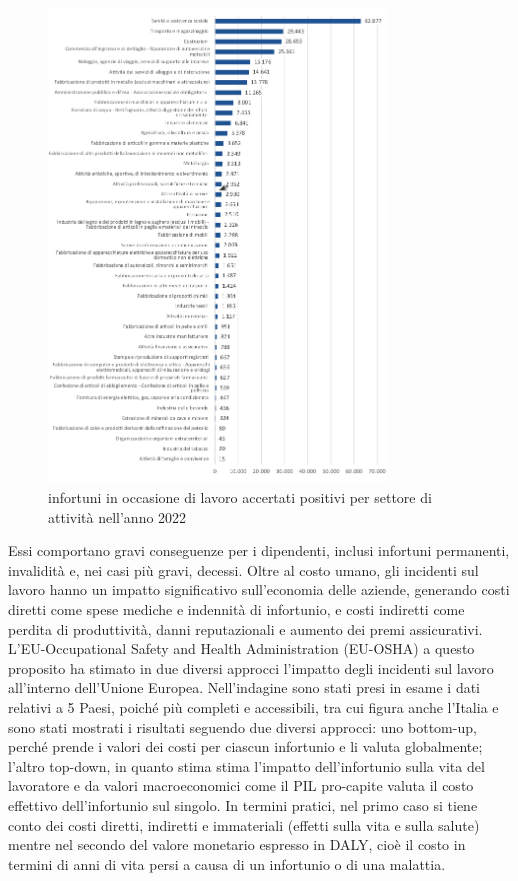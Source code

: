 \begin{figure}[htbp]
    \centering
    \includegraphics[width=0.8\textwidth]{figures/infortuni_industria_e_servizi.png}
    \caption{infortuni in occasione di lavoro accertati positivi per settore di attività nell'anno 2022}
    \label{fig:infortot}
\end{figure}

Essi comportano gravi conseguenze per i dipendenti, inclusi infortuni permanenti, invalidità e, nei casi più gravi, decessi. Oltre al costo umano, gli incidenti sul lavoro hanno un impatto significativo sull'economia delle aziende, generando costi diretti come spese mediche e indennità di infortunio, e costi indiretti come perdita di produttività, danni reputazionali e aumento dei premi assicurativi. L'EU-Occupational Safety and Health Administration (EU-OSHA) a questo proposito ha stimato in due diversi approcci l'impatto degli incidenti sul lavoro all'interno dell'Unione Europea\cite{osha-eu}. Nell'indagine sono stati presi in esame i dati relativi a 5 Paesi, poiché più completi e accessibili, tra cui figura anche l'Italia e sono stati mostrati i risultati seguendo due diversi approcci: uno bottom-up, perché prende i valori dei costi per ciascun infortunio e li valuta globalmente; l'altro top-down, in quanto stima stima l'impatto dell'infortunio sulla vita del lavoratore e da valori macroeconomici come il PIL pro-capite valuta il costo effettivo dell'infortunio sul singolo. In termini pratici, nel primo caso si tiene conto dei costi diretti, indiretti e immateriali (effetti sulla vita e sulla salute) mentre nel secondo del valore monetario espresso in DALY, cioè il costo in termini di anni di vita persi a causa di un infortunio o di una malattia.

